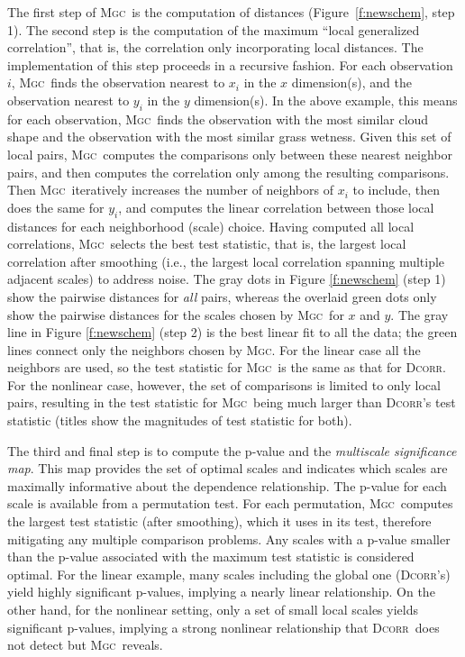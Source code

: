 \documentclass[11pt]{article}
\providecommand{\sct}[1]{{\normalfont\textsc{#1}}}
\newcommand{\Mgc}{\sct{Mgc}}
\newcommand{\Dcorr}{\sct{Dcorr}}
\begin{document}
The first step of \Mgc~is the computation of distances (Figure~\ref{f:newschem}, step 1). The second step is the computation of the maximum ``local generalized correlation'', that is, the correlation only incorporating local distances.
The implementation of this step proceeds in a recursive fashion.  For each observation $i$, \Mgc~finds the observation nearest to $x_i$ in the $x$ dimension(s), and the observation nearest to $y_i$ in the $y$ dimension(s). 
In the above example, this means for each observation, \Mgc~finds the observation with the most similar cloud shape and the observation with the most similar grass wetness.  
Given this set of local pairs, \Mgc~computes the comparisons only between these nearest neighbor pairs, and then computes the correlation only among the resulting comparisons.  
Then \Mgc~iteratively increases the number of neighbors of $x_i$ to include, then does the same for $y_i$, and computes the linear correlation between those local distances for each neighborhood (scale) choice.   
Having computed all local correlations, \Mgc~selects the best test statistic, that is, the largest local correlation after smoothing (i.e., the largest local correlation spanning multiple adjacent scales) to address noise. 
The gray dots in Figure \ref{f:newschem} (step 1) show the pairwise distances for \emph{all} pairs, whereas the overlaid green dots only show the pairwise distances for the scales chosen by \Mgc~for $x$ and $y$.  The gray line in Figure \ref{f:newschem} (step 2) is the best linear fit to all the data; the green lines connect only the neighbors chosen by \Mgc. For the linear case all the neighbors are used, so the test statistic for \Mgc~is the same as that for \Dcorr.  For the nonlinear case, however, the set of comparisons is limited to only local pairs, resulting in the test statistic for \Mgc~being much larger than \Dcorr's test statistic (titles show the magnitudes of test statistic for both).   

The third and final step is to compute the p-value and the \emph{multiscale significance map}. This map provides the set of optimal scales and indicates which scales are maximally informative about the dependence relationship. The p-value for each scale is available from a permutation test.  For each permutation, \Mgc~computes the largest test statistic (after smoothing), which it uses in its test, therefore mitigating any multiple comparison problems.  Any scales with a p-value smaller than the p-value associated with the maximum test statistic is considered optimal.  
For the linear example, many scales including the global one (\Dcorr's) yield highly significant p-values, implying a nearly linear relationship.
On the other hand, for the nonlinear setting, only a set of small local scales yields significant p-values, implying a strong nonlinear relationship that \Dcorr~does not detect but \Mgc~reveals.  
\end{document}
